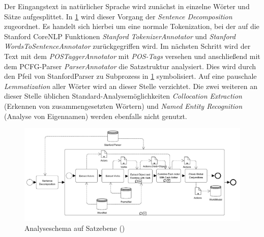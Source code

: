 Der Eingangstext in natürlicher Sprache wird zunächst in einzelne Wörter und Sätze aufgesplittet. In \ref{fig:SLEVEL} wird dieser Vorgang der \textit{Sentence Decomposition} zugeordnet. Es handelt sich hierbei um eine normale Tokenization, bei der auf die Stanford CoreNLP Funktionen \textit{Stanford TokenizerAnnotator} und \textit{Stanford WordsToSentenceAnnotator} zurückgegriffen wird. Im nächsten Schritt wird der Text mit dem \textit{POSTaggerAnnotator} mit \textit{POS-Tags} versehen und anschließend mit dem PCFG-Parser \textit{ParserAnnotator} die Satzstruktur analysiert. Dies wird durch den Pfeil von StanfordParser zu Subprozess in \ref{fig:SLEVEL} symbolisiert. Auf eine pauschale \textit{Lemmatization} aller Wörter wird an dieser Stelle verzichtet. Die zwei weiteren an dieser Stelle üblichen Standard-Analysemöglichkeiten \textit{Collocation Extraction} (Erkennen von zusammengesetzten Wörtern) und \textit{Named Entity Recognition} (Analyse von Eigennamen) werden ebenfalls nicht genutzt.
\par
\begin{figure}
\includegraphics[width=13cm]{pictures/SentenceLevel.png}
\caption{Analyseschema auf Satzebene (\cite[vgl.][5]{FRIEDRICH2})}
\label{fig:SLEVEL}
\end{figure}
\par

